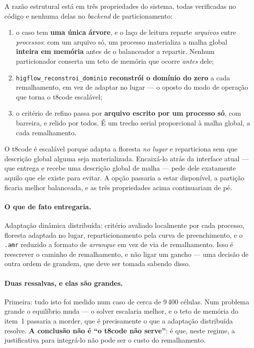 A raz\~ao estrutural est\'a em tr\^es propriedades do sistema, todas verificadas
no c\'odigo e nenhuma delas no \emph{backend} de particionamento:

\begin{enumerate}
  \item o caso tem \textbf{uma \'unica \'arvore}, e o la\c{c}o de leitura reparte
    \emph{arquivos} entre \emph{processos}: com um arquivo s\'o, um processo
    materializa a malha global \textbf{inteira em mem\'oria} antes de o
    balanceador a repartir. Nenhum particionador conserta um teto de mem\'oria
    que ocorre \emph{antes} dele;
  \item \texttt{higflow\_\allowbreak{}reconstroi\_\allowbreak{}dominio} \textbf{reconstr\'oi o dom\'inio do
    zero} a cada remalhamento, em vez de adaptar no lugar --- o oposto do modo de
    opera\c{c}\~ao que torna o t8code escal\'avel;
  \item o crit\'erio de refino passa por \textbf{arquivo escrito por um processo
    s\'o}, com barreira, e relido por todos. \'E um trecho serial proporcional \`a
    malha global, a cada remalhamento.
\end{enumerate}

O t8code \'e escal\'avel porque adapta a floresta \emph{no lugar} e reparticiona
sem que descri\c{c}\~ao global alguma seja materializada. Encaix\'a-lo atr\'as da
interface atual --- que entrega e recebe uma descri\c{c}\~ao global de malha ---
pede dele exatamente aquilo que ele existe para evitar. A op\c{c}\~ao passaria a
estar dispon\'ivel, a parti\c{c}\~ao ficaria melhor balanceada, e as tr\^es
propriedades acima continuariam de p\'e.

\paragraph{O que de fato entregaria.} Adapta\c{c}\~ao din\^amica distribu\'ida:
crit\'erio avaliado localmente por cada processo, floresta adaptada no lugar,
reparticionamento pela curva de preenchimento, e o \texttt{.amr} reduzido a
formato de \emph{arranque} em vez de via de remalhamento. Isso \'e reescrever o
caminho de remalhamento, e n\~ao ligar um gancho --- uma decis\~ao de outra ordem
de grandeza, que deve ser tomada sabendo disso.

\paragraph{Duas ressalvas, e elas s\~ao grandes.} Primeira: tudo isto foi medido
num caso de cerca de 9\,400 c\'elulas. Num problema grande o equil\'ibrio muda ---
o solver escalaria melhor, e o teto de mem\'oria do item~1 passaria a morder, que
\'e precisamente o que a adapta\c{c}\~ao distribu\'ida resolve. \textbf{A
conclus\~ao n\~ao \'e ``o t8code n\~ao serve''}: \'e que, neste regime, a
justificativa para integr\'a-lo n\~ao pode ser o custo do remalhamento.

